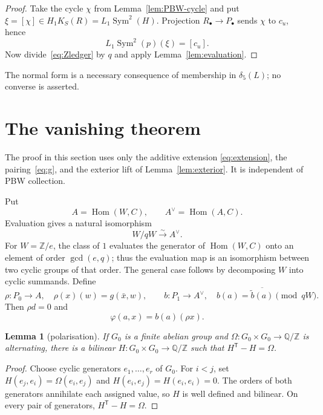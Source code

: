 \documentclass[11pt]{amsart}
\newtheorem{lemma}[theorem]{Lemma}
\theoremstyle{remark}
\newcommand{\Z}{\mathbb Z}
\newcommand{\Q}{\mathbb Q}
\newcommand{\Sym}{\operatorname{Sym}}
\newcommand{\Hom}{\operatorname{Hom}}
\newcommand{\dlt}{\delta}
\begin{document}
\begin{proof}
Take the cycle $\chi$ from Lemma~\ref{lem:PBW-cycle} and put
$\xi=[\chi]\in H_1K_S(R)=L_1\Sym^2(H)$.  Projection
$R_\bullet\to P_\bullet$ sends $\chi$ to $c_u$, hence
\[
 L_1\Sym^2(p)(\xi)=[c_u].
\]
Now divide~\eqref{eq:Zledger} by $q$ and apply
Lemma~\ref{lem:evaluation}.
\end{proof}

The normal form is a necessary consequence of membership in
$\dlt_5(L)$; no converse is asserted.

\section{The vanishing theorem}\label{sec:vanishing}

The proof in this section uses only the additive extension
\eqref{eq:extension}, the pairing~\eqref{eq:g}, and the exterior lift
of Lemma~\ref{lem:exterior}.  It is independent of PBW collection.

Put
\[
 A=\Hom(W,C),
 \qquad A^\vee=\Hom(A,C).
\]
Evaluation gives a natural isomorphism
\begin{equation}\label{eq:bidual}
                         W/qW\xrightarrow{\sim}A^\vee.
\end{equation}
For $W=\Z/e$, the class of $1$ evaluates the generator of
$\Hom(W,C)$ onto an element of order $\gcd(e,q)$; thus the evaluation
map is an isomorphism between two cyclic groups of that order.  The
general case follows by decomposing $W$ into cyclic summands.
Define
\begin{equation}\label{eq:rho-b}
 \rho:P_0\to A,
 \quad \rho(x)(w)=g(\bar x,w),
 \qquad
 b:P_1\to A^\vee,
 \quad b(a)=\overline{\widetilde b(a)}\pmod{qW}.
\end{equation}
Then $\rho d=0$ and
\begin{equation}\label{eq:factorphi}
                         \varphi(a,x)=b(a)(\rho x).
\end{equation}

\begin{lemma}[polarisation]\label{lem:polarisation}
If $G_0$ is a finite abelian group and
$\Omega:G_0\times G_0\to\Q/\Z$ is alternating, there is a bilinear
$H:G_0\times G_0\to\Q/\Z$ such that $H^{\mathsf T}-H=\Omega$.
\end{lemma}

\begin{proof}
Choose cyclic generators $e_1,\ldots,e_r$ of $G_0$.  For $i<j$, set
$H(e_j,e_i)=\Omega(e_i,e_j)$ and $H(e_i,e_j)=H(e_i,e_i)=0$.
The orders of both generators annihilate each assigned value, so $H$
is well defined and bilinear.  On every pair of generators,
$H^{\mathsf T}-H=\Omega$.
\end{proof}
\end{document}
